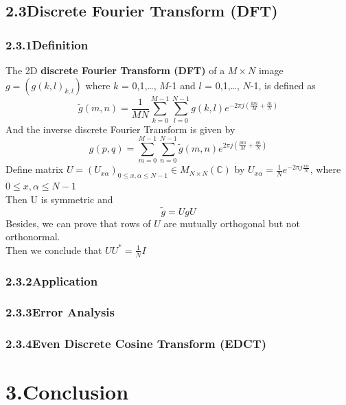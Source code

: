 \documentclass[12pt]{article}
\begin{document}
\subsection*{2.3\quad Discrete Fourier Transform (DFT)}

\subsubsection*{2.3.1\quad Definition}
The 2D \textbf{discrete Fourier Transform (DFT)} of a $M\times N$ image $g = (g(k,l)_{k,l})$ 
where $k$ = 0,1,\ldots, $M$-1 and $l$ = 0,1,\ldots, $N$-1, is defined as 
\begin{equation*}
    \tilde{g}(m,n) = \frac{1}{MN}\sum_{k=0}^{M-1}\sum_{l=0}^{N-1}g(k,l)e^{-2\pi j(\frac{km}{M}+\frac{ln}{N})}
\end{equation*}
And the inverse discrete Fourier Transform is given by
\begin{equation*}
    g(p,q) = \sum_{m=0}^{M-1}\sum_{n=0}^{N-1}\tilde{g}(m,n)e^{2\pi j(\frac{pm}{M}+\frac{qn}{N})}
\end{equation*}
Define matrix $U=(U_{x\alpha})_{0\leqslant x,\alpha \leqslant N-1}\in M_{N\times N}(\mathbb{C})$
by $U_{x\alpha}=\frac{1}{N} e^{-2\pi j\frac{x\alpha}{N}}$, where $0\leqslant x,\alpha \leqslant N-1$\\
Then U is symmetric and 
\begin{equation*}
    \tilde{g} = UgU
\end{equation*}
Besides, we can prove that rows of $U$ are mutually orthogonal but not orthonormal.\\
Then we conclude that $UU^{\ast}=\frac{1}{N}I$


\subsubsection*{2.3.2\quad Application}

\subsubsection*{2.3.3\quad Error Analysis}


\subsubsection*{2.3.4\quad Even Discrete Cosine Transform (EDCT)}




\section*{3.\quad Conclusion}
\end{document}
